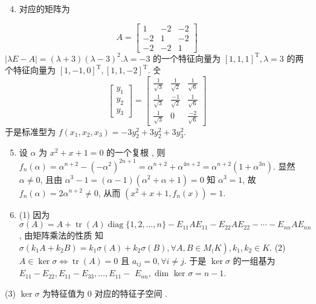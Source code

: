 \documentclass[10pt]{article}
\begin{document}
\begin{enumerate}
  \setcounter{enumi}{3}
  \item  对应的矩阵为 
\end{enumerate}
$$
A=\left[\begin{array}{rrr}
1 & -2 & -2 \\
-2 & 1 & -2 \\
-2 & -2 & 1
\end{array}\right]
$$
$|\lambda E-A|=(\lambda+3)(\lambda-3)^{2} . \lambda=-3$  的一个特征向量为  $[1,1,1]^{\mathrm{T}}, \lambda=3$  的两个特征向量为  $[1,-1,0]^{\mathrm{T}},[1,1,-2]^{\mathrm{T}}$. 숫
$$
\left[\begin{array}{l}
y_{1} \\
y_{2} \\
y_{3}
\end{array}\right]=\left[\begin{array}{ccc}
\frac{1}{\sqrt{3}} & \frac{1}{\sqrt{2}} & \frac{1}{\sqrt{6}} \\
\frac{1}{\sqrt{3}} & \frac{-1}{\sqrt{2}} & \frac{1}{\sqrt{6}} \\
\frac{1}{\sqrt{3}} & 0 & \frac{-2}{\sqrt{6}}
\end{array}\right]
$$
 于是标准型为  $f\left(x_{1}, x_{2}, x_{3}\right)=-3 y_{2}^{2}+3 y_{2}^{2}+3 y_{3}^{2}$.

\begin{enumerate}
  \setcounter{enumi}{4}
  \item  设  $\alpha$  为  $x^{2}+x+1=0$  的一个复根 ,  则  $f_{n}(\alpha)=\alpha^{n+2}-\left(-\alpha^{2}\right)^{2 n+1}=\alpha^{n+2}+\alpha^{4 n+2}=\alpha^{n+2}\left(1+\alpha^{3 n}\right)$.  显然  $\alpha \neq 0$,  且由  $\alpha^{3}-1=(\alpha-1)\left(\alpha^{2}+\alpha+1\right)=0$  知  $\alpha^{3}=1$,  故  $f_{n}(\alpha)=2 \alpha^{n+2} \neq 0$,  从而  $\left(x^{2}+x+1, f_{n}(x)\right)=1$.

  \item (1)  因为  $\sigma(A)=A+\operatorname{tr}(A) \operatorname{diag}\{1,2, \ldots, n\}-E_{11} A E_{11}-E_{22} A E_{22}-\cdots-E_{n n} A E_{n n}$,  由矩阵乘法的性质   知  $\left.\sigma\left(k_{1} A+k_{2} B\right)=k_{1} \sigma(A)+k_{2} \sigma(B), \forall A, B \in M_{(} K\right), k_{1}, k_{2} \in K$. (2) $A \in \operatorname{ker} \sigma \Longleftrightarrow \operatorname{tr}(A)=0$  且  $a_{i j}=0, \forall i \neq j$.  于是  $\operatorname{ker} \sigma$  的一组基为  $E_{11}-E_{22}, E_{11}-E_{33}, \ldots, E_{11}-$ $E_{n n}, \operatorname{dim}$ ker $\sigma=n-1$.

\end{enumerate}
(3) $\operatorname{ker} \sigma$  为特征值为  0  对应的特征子空间 .
\end{document}
